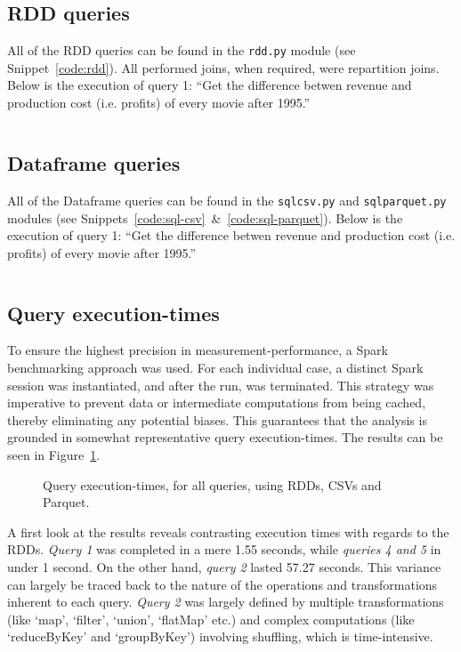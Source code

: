 \documentclass[12pt,twoside]{article}
\begin{document}
\subsection{RDD queries}
All of the RDD queries can be found in the \texttt{rdd.py} module (see Snippet~\ref{code:rdd}). All performed joins, when required, were repartition joins. Below is the execution of query 1: ``Get the difference betwen revenue and production cost (i.e. profits) of every movie after 1995.'' 

\inputminted[breaklines, breakafter=d, linenos, firstline=18, lastline=24]{python}{./code/rdd.py}

\subsection{Dataframe queries}
All of the Dataframe queries can be found in the \texttt{sql\textunderscore csv.py} and \texttt{sql\textunderscore parquet.py} modules (see Snippets~\ref{code:sql-csv}~\&~\ref{code:sql-parquet}). Below is the execution of query 1: ``Get the difference betwen revenue and production cost (i.e. profits) of every movie after 1995.''

\inputminted[breaklines, breakafter=d, linenos, firstline=59, lastline=65]{python}{./code/sql_csv.py}

\subsection{Query execution-times}

To ensure the highest precision in measurement-performance, a Spark benchmarking approach was used. For each individual case, a distinct Spark session was instantiated, and after the run, was terminated. This strategy was imperative to prevent data or intermediate computations from being cached, thereby eliminating any potential biases. This guarantees that the analysis is grounded in somewhat representative query execution-times. The results can be seen in Figure~\ref{fig:execution-times}.

\begin{figure}[!htbp]
    \centering
    
    \caption{Query execution-times, for all queries, using RDDs, CSVs and Parquet.}
    \label{fig:execution-times}
\end{figure}

A first look at the results reveals contrasting execution times with regards to the RDDs. \textit{Query 1} was completed in a mere 1.55 seconds, while \textit{queries 4 and 5} in under 1 second. On the other hand, \textit{query 2} lasted 57.27 seconds. This variance can largely be traced back to the nature of the operations and transformations inherent to each query. \textit{Query 2} was largely defined by multiple transformations (like `map', `filter', `union', `flatMap' etc.) and complex computations (like `reduceByKey' and `groupByKey') involving shuffling, which is time-intensive.
 
\end{document}

